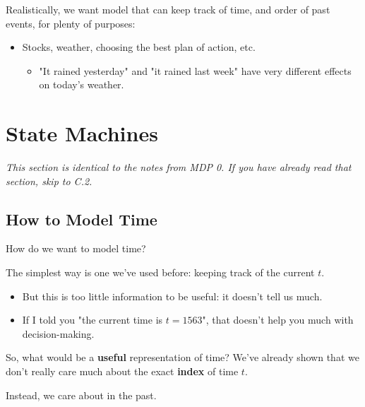         Realistically, we want model that can keep track of time, and order of past events, for plenty of purposes:

        \begin{itemize}
            \item \miniex Stocks, weather, choosing the best plan of action, etc.
                \begin{itemize}
                    \item "It rained yesterday" and "it rained last week" have very different effects on today's weather.
                \end{itemize}
        \end{itemize}
        


    \phantom{}
        


\pagebreak

\section{State Machines}

    \textit{This section is identical to the notes from MDP 0. If you have already read that section, skip to C.2.}

    \iffalse


    \subsection{How to Model Time}

        How do we want to model time?

        The simplest way is one we've used before: keeping track of the current  $t$.

        \begin{itemize}
            \item But this is too little information to be useful: it doesn't tell us much.
            \item \miniex If I told you "the current time is $t=1563$", that doesn't help you much with decision-making.
        \end{itemize}

        So, what would be a \textbf{useful} representation of time? We've already shown that we don't really care much about the exact \textbf{index} of time $t$.

        Instead, we care about  in the past.\\

